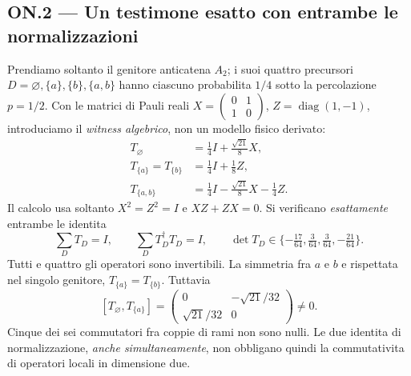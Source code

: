 \documentclass[11pt,a4paper]{article}
\begin{document}
\subsection*{ON.2 --- Un testimone esatto con entrambe le normalizzazioni}
Prendiamo soltanto il genitore anticatena $A_2$; i suoi quattro precursori $D=\varnothing,\{a\},\{b\},\{a,b\}$ hanno ciascuno probabilita $1/4$ sotto la percolazione $p=1/2$. Con le matrici di Pauli reali $X=\left(\begin{smallmatrix}0&1\\1&0\end{smallmatrix}\right)$, $Z=\operatorname{diag}(1,-1)$, introduciamo il \emph{witness algebrico}, non un modello fisico derivato:
\begin{equation}
\begin{split}
 T_{\varnothing}&=\tfrac14I+\tfrac{\sqrt{21}}8X,\\
 T_{\{a\}}=T_{\{b\}}&=\tfrac14I+\tfrac18Z,\\
 T_{\{a,b\}}&=\tfrac14I-\tfrac{\sqrt{21}}8X-\tfrac14Z.
\end{split}\tag{ON.3}
\end{equation}
Il calcolo usa soltanto $X^2=Z^2=I$ e $XZ+ZX=0$. Si verificano \emph{esattamente} entrambe le identita
\begin{equation}
\boxed{\sum_D T_D=I,\qquad \sum_D T_D^\dagger T_D=I,}
\qquad
\det T_D\in\{-\tfrac{17}{64},\tfrac3{64},\tfrac3{64},-\tfrac{21}{64}\}.
\tag{ON.4}
\end{equation}
Tutti e quattro gli operatori sono invertibili. La simmetria fra $a$ e $b$ e rispettata nel singolo genitore, $T_{\{a\}}=T_{\{b\}}$. Tuttavia
\begin{equation}
\boxed{[T_{\varnothing},T_{\{a\}}]
 =\begin{pmatrix}0&-\sqrt{21}/32\\\sqrt{21}/32&0\end{pmatrix}\ne0.}
\tag{ON.5}
\end{equation}
Cinque dei sei commutatori fra coppie di rami non sono nulli. Le due identita di normalizzazione, \emph{anche simultaneamente}, non obbligano quindi la commutativita di operatori locali in dimensione due.

\clearpage
\end{document}
